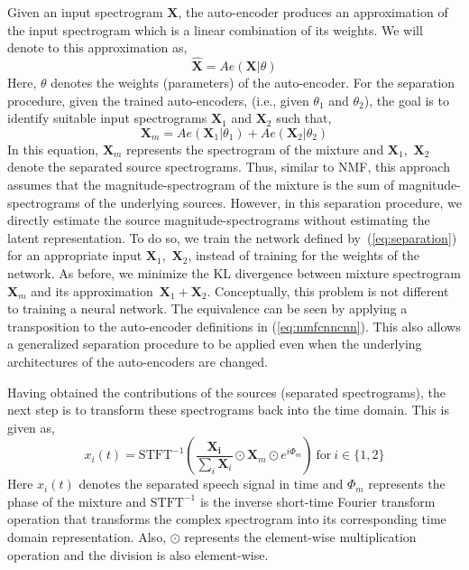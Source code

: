 \documentclass{article}
\begin{document}
Given an input spectrogram $\mathbf{X}$, the auto-encoder produces an approximation of the input spectrogram which is a linear combination of its weights. We will denote to this approximation as,
\begin{equation}
    \hat{\mathbf{X}} = Ae(\mathbf{X}|\theta)
    \label{eq:separation_ae}
\end{equation}
Here, $\theta$ denotes the weights (parameters) of the auto-encoder. For the separation procedure, given the trained auto-encoders, (i.e., given $\theta_{1}$ and $\theta_{2}$), the goal is to identify suitable input spectrograms $\mathbf{X}_{1}$ and $\mathbf{X}_{2}$ such that,
\begin{equation}
    \mathbf{X}_{m} = Ae(\mathbf{X}_{1}|\theta_{1}) + Ae(\mathbf{X}_{2}|\theta_{2}) 
    \label{eq:separation}
\end{equation}
In this equation, $\mathbf{X}_{m}$ represents the spectrogram of the mixture and $\mathbf{X}_{1}$,~$\mathbf{X}_{2}$ denote the separated source spectrograms. Thus, similar to NMF, this approach assumes that the magnitude-spectrogram of the mixture is the sum of magnitude-spectrograms of the underlying sources. However, in this separation procedure, we directly estimate the source magnitude-spectrograms without estimating the latent representation. To do so, we train the network defined by~(\ref{eq:separation}) for an appropriate input $\mathbf{X}_{1}$,~$\mathbf{X}_{2}$, instead of training for the weights of the network. As before, we minimize the KL divergence between mixture spectrogram $\mathbf{X}_{m}$ and its approximation~$\mathbf{X}_{1} + \mathbf{X}_{2}$. Conceptually, this problem is not different to training a neural network. The equivalence can be seen by applying a transposition to the auto-encoder definitions in (\ref{eq:nmfcnncnn}). This also allows a generalized separation procedure to be applied even when the underlying architectures of the auto-encoders are changed.

Having obtained the contributions of the sources (separated spectrograms), the next step is to transform these spectrograms back into the time domain. This is given as,
\begin{equation}
    x_{i}(t) = \text{STFT}^{-1}\left(\frac{\mathbf{X_{i}}}{\sum_{i}\mathbf{X}_{i}}\odot \mathbf{X}_{m} \odot e^{i\Phi_{m}}\right)~\text{for}~i\in\{1, 2\}
\end{equation}
Here $x_{i}(t)$ denotes the separated speech signal in time and $\Phi_{m}$ represents the phase of the mixture and $\text{STFT}^{-1}$ is the inverse short-time Fourier transform operation that transforms the complex spectrogram into its corresponding time domain representation. Also, $\odot$ represents the element-wise multiplication operation and the division is also element-wise.
\end{document}
